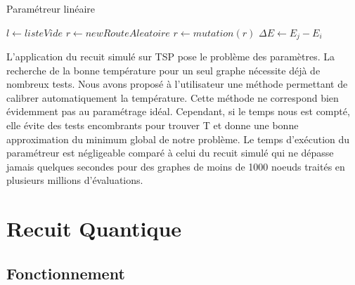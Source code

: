 \documentclass{article}%
\begin{document}
	\begin{algorithm}[!h] 
	\caption{Paramétreur linéaire}
	\begin{algorithmic}
	
	\STATE $ l \leftarrow{listeVide} $
		\STATE $ r \leftarrow{new RouteAleatoire} $
		\STATE $r \leftarrow mutation( r ) $
		\STATE $\Delta{E} \leftarrow E_j-E_i$
		\ENDIF
	\ENDFOR
	\end{algorithmic}
	\end{algorithm}
	
	L'application du recuit simulé sur TSP pose le problème des paramètres. La recherche de la bonne température pour un seul graphe nécessite déjà de nombreux tests. Nous avons proposé à l'utilisateur une méthode permettant de calibrer automatiquement la température. Cette méthode ne correspond bien évidemment pas au paramétrage idéal. Cependant, si le temps nous est compté, elle évite des tests encombrants pour trouver T et donne une bonne approximation du minimum global de notre problème. Le temps d'exécution du paramétreur est négligeable comparé à celui du recuit simulé qui ne dépasse jamais quelques secondes pour des graphes de moins de 1000 noeuds traités en plusieurs millions d'évaluations.
	
	
\clearpage
\section{Recuit Quantique}
\subsection{Fonctionnement}

	\vspace{1cm}
	
\end{document}
